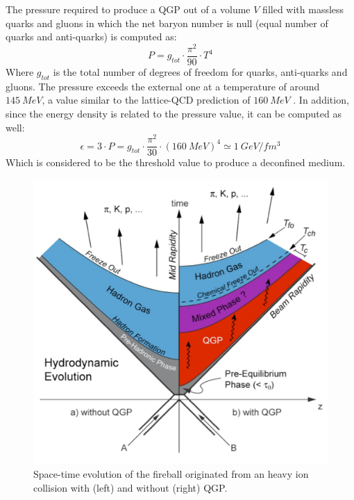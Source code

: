 The pressure required to produce a QGP out of a volume $V$ filled with massless quarks and gluons in which the net baryon number is null (equal number of quarks and anti-quarks) is computed as:
\begin{equation}
P = g_{tot}\cdot\frac{\pi^2}{90}\cdot T^4
\end{equation}
Where $g_{tot}$ is the total number of degrees of freedom for quarks, anti-quarks and gluons.
The pressure exceeds the external one at a temperature of around $145\ MeV$, a value similar to the lattice-QCD prediction of $160\ MeV$ \cite{Kapoyannis:2017hcz}.
In addition, since the energy density is related to the pressure value, it can be computed as well:
\begin{equation}
\epsilon = 3\cdot P = g_{tot}\cdot\frac{\pi^2}{30}\cdot (160\ MeV)^4 \simeq 1\ GeV/fm^3
\end{equation}
Which is considered to be the threshold value to produce a deconfined medium.

\begin{figure}[!t]
\begin{center}
\includegraphics[width=0.85\linewidth]{Chapters/Introduction/Figs/QGP_evo.pdf}
\caption{Space-time evolution of the fireball originated from an heavy ion collision with (left) and without (right) QGP.}
\label{fig:evolution}
\end{center}
\end{figure}



